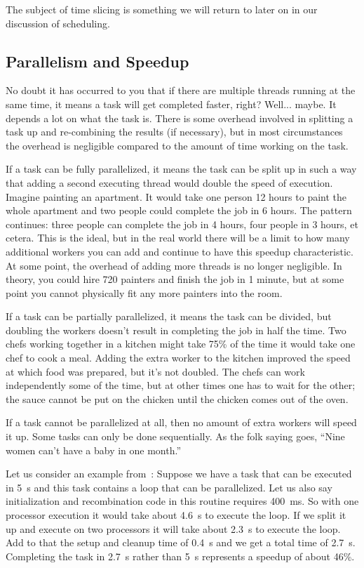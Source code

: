 The subject of time slicing is something we will return to later on in our discussion of scheduling. 

\subsection*{Parallelism and Speedup}

No doubt it has occurred to you that if there are multiple threads running at the same time, it means a task will get completed faster, right? Well... maybe. It depends a lot on what the task is. There is some overhead involved in splitting a task up and re-combining the results (if necessary), but in most circumstances the overhead is negligible compared to the amount of time working on the task.  

If a task can be fully parallelized, it means the task can be split up in such a way that adding a second executing thread would double the speed of execution. Imagine painting an apartment. It would take one person 12 hours to paint the whole apartment and two people could complete the job in 6 hours. The pattern continues: three people can complete the job in 4 hours, four people in 3 hours, et cetera. This is the ideal, but in the real world there will be a limit to how many additional workers you can add and continue to have this speedup characteristic. At some point, the overhead of adding more threads is no longer negligible. In theory, you could hire 720 painters and finish the job in 1 minute, but at some point you cannot physically fit any more painters into the room.

If a task can be partially parallelized, it means the task can be divided, but doubling the workers doesn't result in completing the job in half the time. Two chefs working together in a kitchen might take 75\% of the time it would take one chef to cook a meal. Adding the extra worker to the kitchen improved the speed at which food was prepared, but it's not doubled. The chefs can work independently some of the time, but at other times one has to wait for the other; the sauce cannot be put on the chicken until the chicken comes out of the oven.

If a task cannot be parallelized at all, then no amount of extra workers will speed it up. Some tasks can only be done sequentially. As the folk saying goes, ``Nine women can't have a baby in one month.''

Let us consider an example from~\cite{mte241}: Suppose we have a task that can be executed in 5~s and this task contains a loop that can be parallelized. Let us also say initialization and recombination code in this routine requires 400~ms. So with one processor execution it would take about 4.6~s to execute the loop. If we split it up and execute on two processors it will take about 2.3~s to execute the loop. Add to that the setup and cleanup time of 0.4~s and we get a total time of 2.7~s. Completing the task in 2.7~s rather than 5~s represents a speedup of about 46\%.

